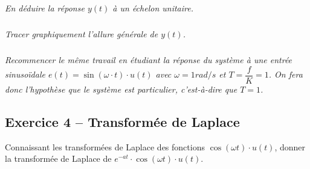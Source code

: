 \documentclass[11pt,oneside]{article}
\begin{document}
\subparagraph{}
\textit{En déduire la réponse $y(t)$ à un échelon unitaire.}


\subparagraph{}
\textit{Tracer graphiquement l'allure générale de $y(t)$. }


\subparagraph{}
\textit{Recommencer le même travail en étudiant la réponse du système à une entrée sinusoïdale $e(t)=\sin\left( \omega\cdot t\right)\cdot u(t)$ avec $\omega = 1 rad/s$ et $T=\dfrac{f}{K}=1$. On fera donc l'hypothèse que le système est particulier, c'est-à-dire que $T=1$.}



\subsection*{Exercice 4 -- Transformée de Laplace}
\setcounter{subparagraph}{0}
Connaissant les transformées de Laplace des fonctions $\cos (\omega t)\cdot u(t)$, donner la transformée de Laplace de $e^{-at}\cdot\cos (\omega t)\cdot u(t)$.
\end{document}
